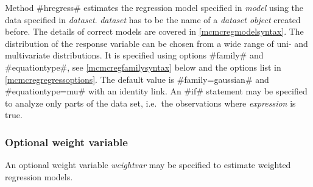 Method #hregress# estimates the regression model specified in {\em
model} using the data specified in {\em dataset}. {\em dataset}
has to be the name of a {\em dataset object} created before. The
details of correct models are covered in \autoref{mcmcregmodelsyntax}.
The distribution of the response variable can be chosen from a wide
range of uni- and multivariate distributions. It is
specified using options
#family# and #equationtype#, see \autoref{mcmcregfamilysyntax} below and the options list in
\autoref{mcmcregregressoptions}. The default value is #family=gaussian# and #equationtype=mu#
with an identity link.  An #if# statement may be specified to analyze
only parts of the data set, i.e.~the observations where {\em
expression} is true.

\subsubsection{Optional weight variable}
\label{weightspecification}

An optional weight variable {\em weightvar} may be specified to
estimate weighted regression models.


%

